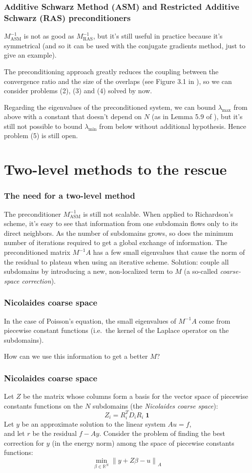 \documentclass{beamer}
\newcommand{\norm}[1]{\left\lVert#1\right\rVert}
\newcommand{\R}{\mathbb{R}}
\begin{document}
\begin{frame}
\frametitle{Additive Schwarz Method (ASM)
	and Restricted Additive Schwarz (RAS) preconditioners}
$M_\text{ASM}^{-1}$ is not as good as $M_\text{RAS}^{-1}$, but it's
still useful in practice because it's symmetrical
(and so it can be used with the conjugate gradients method,
just to give an example).

The preconditioning approach greatly reduces the coupling
between the convergence ratio and the size of the overlaps
(see Figure 3.1 in \cite{nataf}),
so we can consider problems (2), (3) and (4) solved by now.

Regarding the eigenvalues of the preconditioned system,
we can bound $\lambda_\text{max}$ from above with a constant
that doesn't depend on $N$ (as in Lemma 5.9 of \cite{nataf}),
but it's still not possible to bound $\lambda_\text{min}$ from below
without additional hypothesis. Hence problem (5) is still open.
\end{frame}

\section{Two-level methods to the rescue}
\begin{frame}
\frametitle{The need for a two-level method}
The preconditioner $M_\text{ASM}^{-1}$ is still not scalable.
When applied to Richardson's scheme, it's easy to see that information
from one subdomain flows only to its direct neighbors.
As the number of subdomains grows, so does the minimum number of iterations required
to get a global exchange of information.
The preconditioned matrix $M^{-1}A$ has a few small eigenvalues that cause
the norm of the residual to plateau when using an iterative scheme.
Solution: couple all subdomains by introducing a new, non-localized
term to $M$ (a so-called \emph{coarse-space correction}).
\end{frame}

\begin{frame}
\frametitle{Nicolaides coarse space}
In the case of Poisson's equation, the small eigenvalues
of $M^{-1}A$ come from piecewise constant functions
(i.e.\ the kernel of the Laplace operator on the subdomains).

How can we use this information to get a better $M$?
\end{frame}

\begin{frame}
\frametitle{Nicolaides coarse space}
Let $Z$ be the matrix whose columns form a basis for the vector space
of piecewise constants functions on the $N$ subdomains
(the \emph{Nicolaides coarse space}):
\[
Z_i = R_i^T D_i R_i \;\! \textbf{1}
\]
Let $y$ be an approximate solution to the linear system $Au = f$,\\
and let $r$ be the residual $f-Ay$. Consider the problem of finding
the best correction for $y$ (in the energy norm)
among the space of piecewise constants functions:
\[
\min_{\beta \in \R^N} \norm{y+Z\beta-u}_A
\]
\end{frame}
\end{document}
